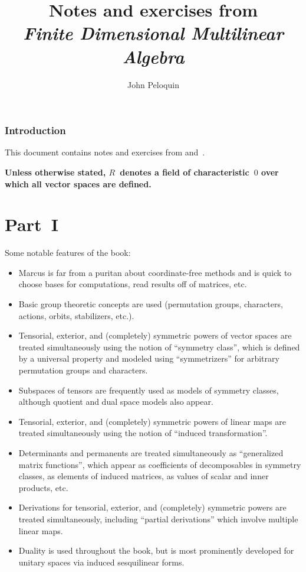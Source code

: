 \documentclass[letterpaper,12pt]{article}
\title{Notes and exercises from\\\textit{Finite Dimensional Multilinear Algebra}}
\author{John Peloquin}
\date{}
\theoremstyle{definition}
\theoremstyle{remark}
\begin{document}
\maketitle

\section*{Introduction}
This document contains notes and exercises from \cite{marcus1} and~\cite{marcus2}.

\bigskip
\noindent
{\boldmath\textbf{Unless otherwise stated, \(R\)~denotes a field of characteristic~\(0\) over which all vector spaces are defined.}}

\newpage
\part*{Part~I}
Some notable features of the book:
\begin{itemize}[itemsep=0pt]
\item Marcus is far from a puritan about coordinate-free methods and is quick to choose bases for computations, read results off of matrices, etc.
\item Basic group theoretic concepts are used (permutation groups, characters, actions, orbits, stabilizers, etc.).
\item Tensorial, exterior, and (completely) symmetric powers of vector spaces are treated simultaneously using the notion of ``symmetry class'', which is defined by a universal property and modeled using ``symmetrizers'' for arbitrary permutation groups and characters.
\item Subspaces of tensors are frequently used as models of symmetry classes, although quotient and dual space models also appear.
\item Tensorial, exterior, and (completely) symmetric powers of linear maps are treated simultaneously using the notion of ``induced transformation''.
\item Determinants and permanents are treated simultaneously as ``generalized matrix functions'', which appear as coefficients of decomposables in symmetry classes, as elements of induced matrices, as values of scalar and inner products, etc.
\item Derivations for tensorial, exterior, and (completely) symmetric powers are treated simultaneously, including ``partial derivations'' which involve multiple linear maps.
\item Duality is used throughout the book, but is most prominently developed for unitary spaces via induced sesquilinear forms.
\end{itemize}
\end{document}
